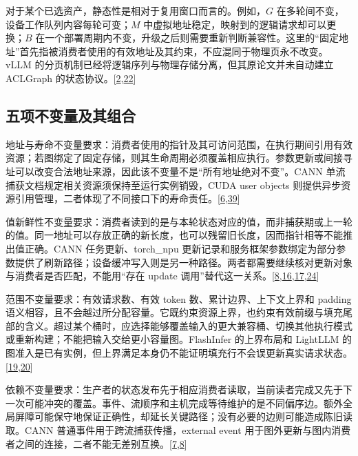 \documentclass[
  UTF8,
  zihao=5]{ctexart}
\begin{document}
对于某个已选资产，静态性是相对于复用窗口而言的。例如，\(G\)
在多轮间不变，设备工作队列内容每轮可变；\(M\)
中虚拟地址稳定，映射到的逻辑请求却可以更换；\(B\)
在一个部署周期内不变，升级之后则需要重新判断兼容性。这里的``固定地址''首先指被消费者使用的有效地址及其约束，不应混同于物理页永不改变。vLLM
的分页机制已经将逻辑序列与物理存储分离，但其原论文并未自动建立 ACLGraph
的状态协议。{[}\protect\hyperlink{ref-kwon2023vllm}{2},\protect\hyperlink{ref-liu2026foundry}{22}{]}

\hypertarget{ux4e94ux9879ux4e0dux53d8ux91cfux53caux5176ux7ec4ux5408}{%
\subsection*{五项不变量及其组合}\label{ux4e94ux9879ux4e0dux53d8ux91cfux53caux5176ux7ec4ux5408}}

地址与寿命不变量要求：消费者使用的指针及其可访问范围，在执行期间引用有效资源；若图绑定了固定存储，则其生命周期必须覆盖相应执行。参数更新或间接寻址可以改变合法地址来源，因此该不变量不是``所有地址绝对不变''。CANN
单流捕获文档规定相关资源须保持至运行实例销毁，CUDA user objects
则提供异步资源引用管理，二者体现了不同接口下的寿命责任。{[}\protect\hyperlink{ref-cann910single}{6},\protect\hyperlink{ref-nvidia2025cudaguide}{39}{]}

值新鲜性不变量要求：消费者读到的是与本轮状态对应的值，而非捕获期或上一轮的值。同一地址可以存放正确的新长度，也可以残留旧长度，因而指针相等不能推出值正确。CANN
任务更新、torch\_npu
更新记录和服务框架参数绑定为部分参数提供了刷新路径；设备缓冲写入则是另一种路径。两者都需要继续核对更新对象与消费者是否匹配，不能用``存在
update
调用''替代这一关系。{[}\protect\hyperlink{ref-cann910update}{8},\protect\hyperlink{ref-vllmascend2026impl}{16},\protect\hyperlink{ref-sglang2026impl}{17},\protect\hyperlink{ref-torchnpu2026graphs}{24}{]}

范围不变量要求：有效请求数、有效 token 数、累计边界、上下文上界和
padding
语义相容，且不会越过所分配容量。它既约束资源上界，也约束有效前缀与填充尾部的含义。超过某个桶时，应选择能够覆盖输入的更大兼容桶、切换其他执行模式或重新构建；不能把输入交给更小容量图。FlashInfer
的上界布局和 LightLLM
的图准入是已有实例，但上界满足本身仍不能证明填充行不会误更新真实请求状态。{[}\protect\hyperlink{ref-lightllm2026code}{19},\protect\hyperlink{ref-ye2025flashinfer}{20}{]}

依赖不变量要求：生产者的状态发布先于相应消费者读取，当前读者完成又先于下一次可能冲突的覆盖。事件、流顺序和主机完成等待维护的是不同偏序边。额外全局屏障可能保守地保证正确性，却延长关键路径；没有必要的边则可能造成陈旧读取。CANN
普通事件用于跨流捕获传播，external event
用于图外更新与图内消费者之间的连接，二者不能无差别互换。{[}\protect\hyperlink{ref-cann910multi}{7},\protect\hyperlink{ref-cann910update}{8}{]}
\end{document}
